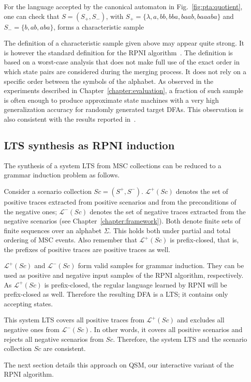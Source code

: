 For the language accepted by the canonical automaton in Fig.~\ref{fig:pta:quotient}, one can check that $S = (S_+, S_-)$, with $S_+ = \{\lambda, a, bb, bba, baab, baaaba\}$ and $S_- = \{b, ab, aba\}$, forms a characteristic sample 

The definition of a characteristic sample given above may appear quite strong. It is however the standard definition for the RPNI algorithm~\cite{Oncina:1992,Dupont:1996b}. The definition is based on a worst-case analysis that does not make full use of the exact order in which state pairs are considered during the merging process. It does not rely on a specific order between the symbols of the alphabet. As observed in the experiments described in Chapter~\ref{chapter:evaluation}, a fraction of such sample is often enough to produce approximate state machines with a very high generalization accuracy for randomly generated target DFAs. This observation is also consistent with the results reported in~\cite{Lang:1998}.

\subsection{LTS synthesis as RPNI induction\label{subsection:inductive-lts-synthesis-reduction}}

The synthesis of a system LTS from MSC collections can be reduced to a grammar induction problem as follows. 

Consider a scenario collection $Sc = (S^+, S^-)$. $\mathcal{L}^+(Sc)$ denotes the set of positive traces extracted from positive scenarios and from the preconditions of the negative ones; $\mathcal{L}^-(Sc)$ denotes the set of negative traces extracted from the negative scenarios (see Chapter~\ref{chapter:framework}). Both denote finite sets of finite sequences over an alphabet $\Sigma$. This holds both under partial and total ordering of MSC events. Also remember that $\mathcal{L}^+(Sc)$ is prefix-closed, that is, the prefixes of positive traces are positive traces as well.

$\mathcal{L}^+(Sc)$ and $\mathcal{L}^-(Sc)$ form valid samples for grammar induction. They can be used as positive and negative input samples of the RPNI algorithm, respectively. As $\mathcal{L}^+(Sc)$ is prefix-closed, the regular language learned by RPNI will be prefix-closed as well. Therefore the resulting DFA is a LTS; it contains only accepting states. 

This system LTS covers all positive traces from $\mathcal{L}^+(Sc)$ and excludes all negative ones from $\mathcal{L}^-(Sc)$. In other words, it covers all positive scenarios and rejects all negative scenarios from $Sc$. Therefore, the system LTS and the scenario collection $Sc$ are consistent.

The next section details this approach on QSM, our interactive variant of the RPNI algorithm.
